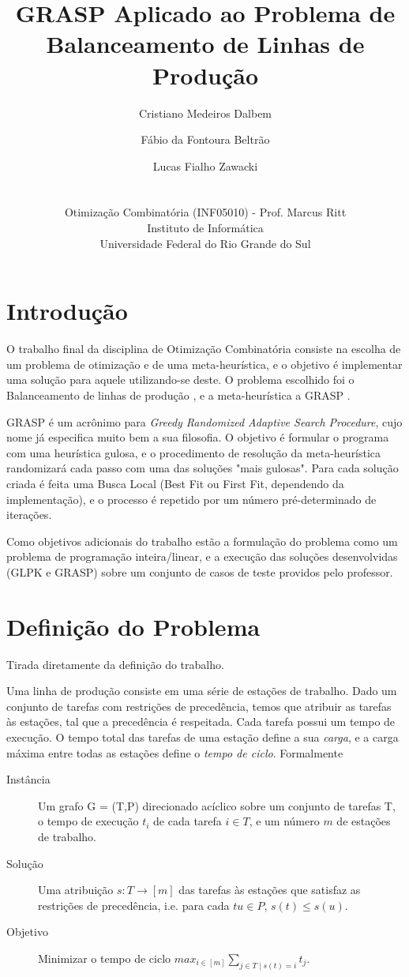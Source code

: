 \documentclass{report}
\title{GRASP Aplicado ao Problema de Balanceamento de Linhas de Produção}
\author{Cristiano Medeiros Dalbem \and Fábio da Fontoura Beltrão \and Lucas Fialho Zawacki\\
\\
\\
\small Otimização Combinatória (INF05010) - Prof. Marcus Ritt\\
\small Instituto de Informática\\[-0.8ex]
\small Universidade Federal do Rio Grande do Sul
}
\begin{document}
\maketitle
\tableofcontents

\chapter{Introdução}

O trabalho final da disciplina de Otimização Combinatória consiste na escolha de
 um problema de otimização e de uma meta-heurística, e o objetivo é implementar
 uma solução para aquele utilizando-se deste. O problema escolhido foi o
 Balanceamento de linhas de produção \cite{salbp}, e a meta-heurística a GRASP \cite{grasp}.

GRASP é um acrônimo para \emph{Greedy Randomized Adaptive Search Procedure},
cujo nome já especifica muito bem a sua filosofia. O objetivo é formular o
programa com uma heurística gulosa, e o procedimento de resolução da
meta-heurística randomizará cada passo com uma das soluções "mais gulosas".
Para cada solução criada é feita uma Busca Local (Best Fit ou First Fit,
dependendo da implementação), e o processo é repetido por um número
pré-determinado de iterações.

Como objetivos adicionais do trabalho estão a formulação do problema como
um problema de programação inteira/linear, e a execução das soluções
desenvolvidas (GLPK e GRASP) sobre um conjunto de casos de
teste providos pelo professor.

\chapter{Definição do Problema}

Tirada diretamente da definição do trabalho.

Uma linha de produção consiste em uma série de estações de trabalho.
Dado um conjunto de tarefas com restrições de
precedência, temos que atribuir as tarefas às estações, tal que a precedência
é respeitada. Cada tarefa possui um tempo
de execução. O tempo total das tarefas de uma estação define a sua
\emph{carga}, e a carga máxima entre todas as
estações define o \emph{tempo de ciclo}. Formalmente

\begin{description}
 \item [Instância] Um grafo G = (T,P) direcionado acíclico sobre um conjunto de
 tarefas T, o tempo de execução $t_i$ de
cada tarefa $i \in T$, e um número $m$ de estações de trabalho.

 \item [Solução] Uma atribuição $s : T \rightarrow [m]$ das tarefas às
 estações que satisfaz as restrições de
precedência, i.e. para cada $tu \in P$, $s(t) \leq s(u)$.

 \item [Objetivo] Minimizar o tempo de ciclo  $max_{i\in[m]}\sum_{j\in T\mid s(t)=i}t_j$.
\end{description}
\end{document}
